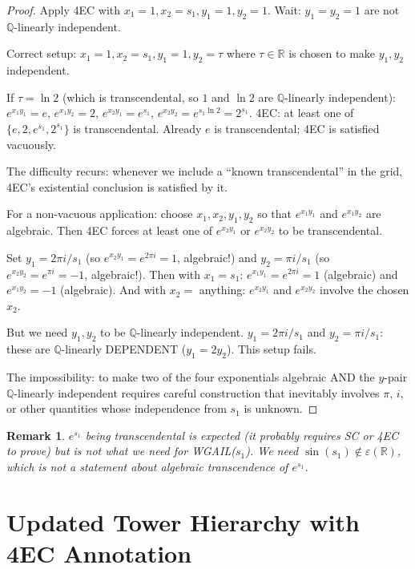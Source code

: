 \documentclass[11pt]{article}
\newtheorem{remark}[theorem]{Remark}
\begin{document}
\begin{proof}
Apply 4EC with $x_1 = 1, x_2 = s_1, y_1 = 1, y_2 = 1$.
Wait: $y_1 = y_2 = 1$ are not $\mathbb{Q}$-linearly independent.

Correct setup: $x_1 = 1, x_2 = s_1, y_1 = 1, y_2 = \tau$ where
$\tau \in \mathbb{R}$ is chosen to make $y_1, y_2$ independent.

If $\tau = \ln 2$ (which is transcendental, so $1$ and $\ln 2$ are $\mathbb{Q}$-linearly independent):
$e^{x_1 y_1} = e$, $e^{x_1 y_2} = 2$, $e^{x_2 y_1} = e^{s_1}$, $e^{x_2 y_2} = e^{s_1 \ln 2} = 2^{s_1}$.
4EC: at least one of $\{e, 2, e^{s_1}, 2^{s_1}\}$ is transcendental.
Already $e$ is transcendental; 4EC is satisfied vacuously.

The difficulty recurs: whenever we include a ``known transcendental'' in the grid,
4EC's existential conclusion is satisfied by it.

For a non-vacuous application: choose $x_1, x_2, y_1, y_2$ so that
$e^{x_1 y_1}$ and $e^{x_1 y_2}$ are algebraic. Then 4EC forces at least
one of $e^{x_2 y_1}$ or $e^{x_2 y_2}$ to be transcendental.

Set $y_1 = 2\pi i / s_1$ (so $e^{x_2 y_1} = e^{2\pi i} = 1$, algebraic!)
and $y_2 = \pi i / s_1$ (so $e^{x_2 y_2} = e^{\pi i} = -1$, algebraic!).
Then with $x_1 = s_1$: $e^{x_1 y_1} = e^{2\pi i} = 1$ (algebraic) and $e^{x_1 y_2} = -1$ (algebraic).
And with $x_2 = $ anything: $e^{x_2 y_1}$ and $e^{x_2 y_2}$ involve the chosen $x_2$.

But we need $y_1, y_2$ to be $\mathbb{Q}$-linearly independent.
$y_1 = 2\pi i / s_1$ and $y_2 = \pi i / s_1$: these are $\mathbb{Q}$-linearly DEPENDENT
($y_1 = 2 y_2$). This setup fails.

The impossibility: to make two of the four exponentials algebraic AND the $y$-pair
$\mathbb{Q}$-linearly independent requires careful construction that inevitably
involves $\pi$, $i$, or other quantities whose independence from $s_1$ is unknown.
\end{proof}

\begin{remark}
$e^{s_1}$ being transcendental is expected (it probably requires SC or 4EC to prove)
but is not what we need for WGAIL($s_1$). We need $\sin(s_1) \notin \varepsilon(\mathbb{R})$,
which is not a statement about algebraic transcendence of $e^{s_1}$.
\end{remark}

\section{Updated Tower Hierarchy with 4EC Annotation}
\end{document}

